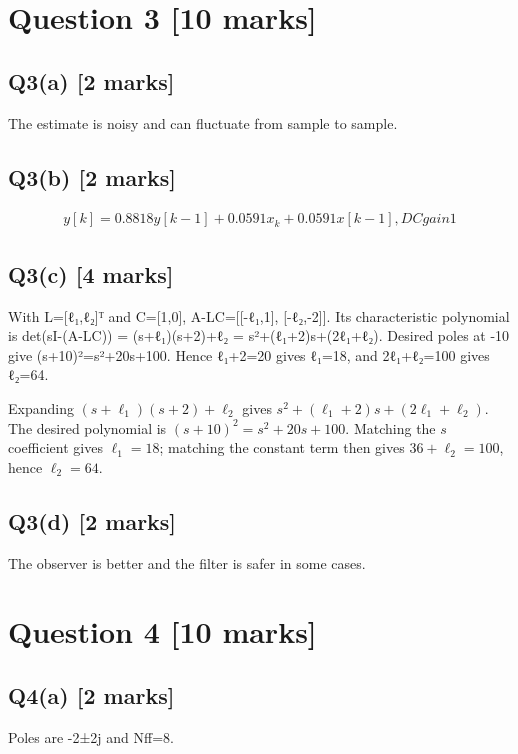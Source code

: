 \documentclass[11pt,a4paper]{article}
\begin{document}
\section*{Question 3 \hfill [10 marks]}
\subsection*{Q3(a) \hfill [2 marks]}

The estimate is noisy and can fluctuate from sample to sample.

\subsection*{Q3(b) \hfill [2 marks]}

\[\begin{aligned}y[k]=0.8818y[k-1]+0.0591x_k+0.0591x[k-1], DC gain 1\end{aligned}\]

\subsection*{Q3(c) \hfill [4 marks]}

With L=[ℓ₁,ℓ₂]ᵀ and C=[1,0], A-LC=[[-ℓ₁,1], [-ℓ₂,-2]].
Its characteristic polynomial is det(sI-(A-LC)) = (s+ℓ₁)(s+2)+ℓ₂ = s²+(ℓ₁+2)s+(2ℓ₁+ℓ₂).
Desired poles at -10 give (s+10)²=s²+20s+100.
Hence ℓ₁+2=20 gives ℓ₁=18, and 2ℓ₁+ℓ₂=100 gives ℓ₂=64.\par\smallskip Expanding $(s+\ell_1)(s+2)+\ell_2$ gives $s^2+(\ell_1+2)s+(2\ell_1+\ell_2)$. The desired polynomial is $(s+10)^2=s^2+20s+100$. Matching the $s$ coefficient gives $\ell_1=18$; matching the constant term then gives $36+\ell_2=100$, hence $\ell_2=64$.

\subsection*{Q3(d) \hfill [2 marks]}

The observer is better and the filter is safer in some cases.

\section*{Question 4 \hfill [10 marks]}
\subsection*{Q4(a) \hfill [2 marks]}

Poles are -2±2j and Nff=8.
\end{document}
